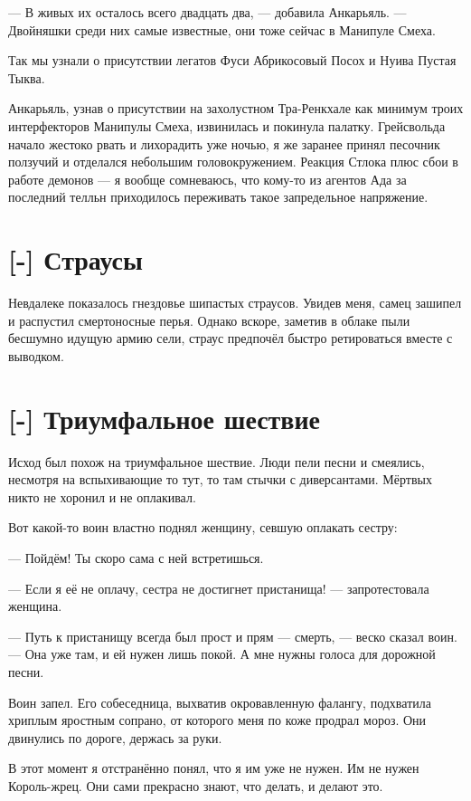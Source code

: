 --- В живых их осталось всего двадцать два, --- добавила Анкарьяль.
--- Двойняшки среди них самые известные, они тоже сейчас в Манипуле Смеха.

Так мы узнали о присутствии легатов Фуси Абрикосовый Посох и Нуива Пустая Тыква.

Анкарьяль, узнав о присутствии на захолустном Тра-Ренкхале как минимум троих интерфекторов Манипулы Смеха, извинилась и покинула палатку.
Грейсвольда начало жестоко рвать и лихорадить уже ночью, я же заранее принял песочник ползучий и отделался небольшим головокружением.
Реакция Стлока плюс сбои в работе демонов --- я вообще сомневаюсь, что кому-то из агентов Ада за последний телльн приходилось переживать такое запредельное напряжение.

\section{[-] Страусы}

Невдалеке показалось гнездовье шипастых страусов.
Увидев меня, самец зашипел и распустил смертоносные перья.
Однако вскоре, заметив в облаке пыли бесшумно идущую армию сели, страус предпочёл быстро ретироваться вместе с выводком.

\section{[-] Триумфальное шествие}

Исход был похож на триумфальное шествие.
Люди пели песни и смеялись, несмотря на вспыхивающие то тут, то там стычки с диверсантами.
Мёртвых никто не хоронил и не оплакивал.

Вот какой-то воин властно поднял женщину, севшую оплакать сестру:

--- Пойдём!
Ты скоро сама с ней встретишься.

--- Если я её не оплачу, сестра не достигнет пристанища! --- запротестовала женщина.

--- Путь к пристанищу всегда был прост и прям --- смерть, --- веско сказал воин.
--- Она уже там, и ей нужен лишь покой.
А мне нужны голоса для дорожной песни.

Воин запел.
Его собеседница, выхватив окровавленную фалангу, подхватила хриплым яростным сопрано, от которого меня по коже продрал мороз.
Они двинулись по дороге, держась за руки.

В этот момент я отстранённо понял, что я им уже не нужен.
Им не нужен Король-жрец.
Они сами прекрасно знают, что делать, и делают это.

